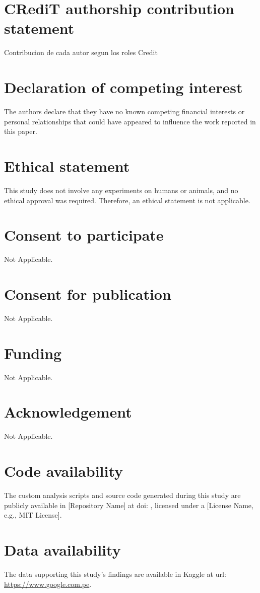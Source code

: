 \section*{CRediT authorship contribution statement}
\label{sec:authorship_contribution}
Contribucion de cada autor segun los roles Credit

\section*{Declaration of competing interest}
\label{sec:competing_interest}
The authors declare that they have no known competing financial interests or personal relationships that could have appeared to influence the work reported in this paper.

\section*{Ethical statement}
\label{sec:ethical_statement}
This study does not involve any experiments on humans or animals, and no ethical approval was required. Therefore, an ethical statement is not applicable.

\section*{Consent to participate}
\label{sec:consent_participate}
Not Applicable.

\section*{Consent for publication}
\label{sec:consent_publication}
Not Applicable.

\section*{Funding}
\label{sec:funding}
Not Applicable.

\section*{Acknowledgement}
\label{sec:acknowledgement}
Not Applicable.

\section*{Code availability}
\label{sec:code_availability}
The custom analysis scripts and source code generated during this study are publicly available in [Repository Name] at doi: , licensed under a [License Name, e.g., MIT License].

\section*{Data availability}
\label{sec:data_availability}
The data supporting this study's findings are available in Kaggle at url: \url{https://www.google.com.pe}.
